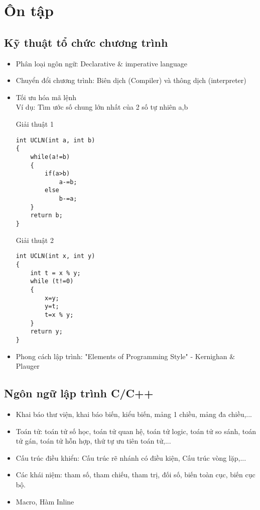 \documentclass[12pt,a4paper]{article}
\begin{document}
\section{Ôn tập}
\subsection{Kỹ thuật tổ chức chương trình}
\begin{itemize}
	\item
	Phân loại ngôn ngữ: Declarative $\&$ imperative language
	\item
	 Chuyển đổi chương trình:  Biên dịch (Compiler) và thông dịch (interpreter)
	 \item
	 Tối ưu hóa mã lệnh\\
	 Ví dụ: Tìm ước số chung lớn nhất của 2 số tự nhiên a,b


 Giải thuật 1 \\
\begin{lstlisting}
int UCLN(int a, int b)
{
	while(a!=b)
	{
		if(a>b)
			a-=b;
		else
			b-=a;
	}
	return b;
}
\end{lstlisting}

Giải thuật 2  \\
\begin{lstlisting}
int UCLN(int x, int y)
{
	int t = x % y;
	while (t!=0)
	{
		x=y;
		y=t;
		t=x % y;
	}
	return y;
}
\end{lstlisting}
	\item
	Phong cách lập trình: "Elements of Programming Style" - Kernighan $\&$ Plauger
\end{itemize}

\subsection{Ngôn ngữ lập trình C/C++}
\begin{itemize}
	\item
	Khai báo thư viện, khai báo biến, kiểu biến, mảng 1 chiều, mảng đa chiều,...
	\item
	Toán tử: toán tử số học, toán tử quan hệ, toán tử logic, toán tử so sánh, toán tử gán, toán tử hỗn hợp, thứ tự ưu tiên toán tử,...
	\item
	Cấu trúc điều khiển: Cấu trúc rẽ nhánh có điều kiện, Cấu trúc vòng lặp,...
	\item
	Các khái niệm: tham số, tham chiếu, tham trị, đối số, biến toàn cục, biến cục bộ.
	\item
	Macro, Hàm Inline
\end{itemize}
\end{document}
